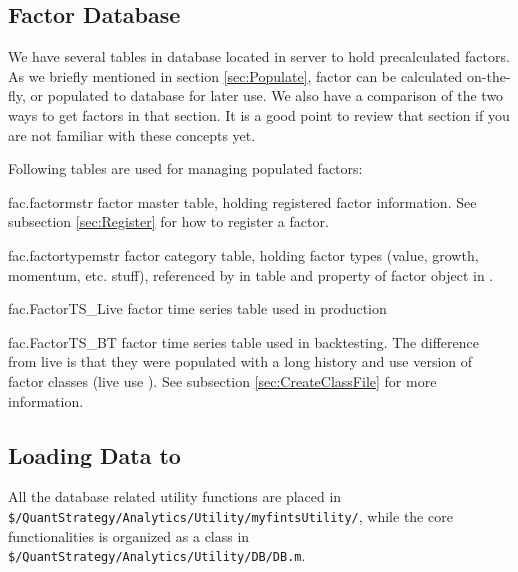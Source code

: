 \subsection{Factor Database}

We have several tables in database 
located in server  to hold precalculated factors.
As we briefly mentioned in section \ref{sec:Populate},
factor can be calculated on-the-fly, or populated to database for later use.
We also have a comparison of the two ways to get factors in that section.
It is a good point to review that section if you are not familiar with these concepts yet.

Following tables are used for managing populated factors:
\begin{argdesc}
  \item [fac.factormstr]      factor master table,  holding registered factor information.
                              See subsection \ref{sec:Register} for how to register a factor.
  \item [fac.factortypemstr]  factor category table, holding factor types (value, growth, momentum, etc. stuff), 
                              referenced by  in table 
                              and  property of factor object in \matlab{}.
  \item [fac.FactorTS\_Live]  factor time series table used in production
  \item [fac.FactorTS\_BT]    factor time series table used in backtesting. 
                              The difference from live is that they were populated with a long history and use 
                              version of factor classes (live use ).
                              See subsection \ref{sec:CreateClassFile} for more information.
\end{argdesc}


\subsection{Loading Data to \matlab}

All the database related utility functions are placed in 
\texttt{\$/\allowbreak{}QuantStrategy/\allowbreak{}Analytics/\allowbreak{}Utility/\allowbreak{}myfintsUtility/},
while the core functionalities is organized as a class in
\texttt{\$/\allowbreak{}QuantStrategy/\allowbreak{}Analytics/\allowbreak{}Utility/\allowbreak{}DB/\allowbreak{}DB.m}.

